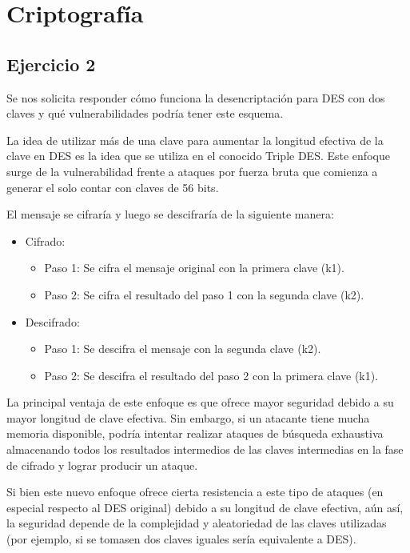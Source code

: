 \documentclass[11pt]{article}
\begin{document}
\section{Criptografía}

\subsection*{Ejercicio 2}
Se nos solicita responder cómo funciona la desencriptación para DES con dos claves y 
qué vulnerabilidades podría tener este esquema.

La idea de utilizar más de una clave para aumentar la longitud efectiva de la clave en DES es la idea 
que se utiliza en el conocido Triple DES. Este enfoque surge de la vulnerabilidad frente a ataques por fuerza bruta 
que comienza a generar el solo contar con claves de 56 bits.

El mensaje se cifraría y luego se descifraría de la siguiente manera:

\begin{itemize}
\item Cifrado:

\begin{itemize}
\item Paso 1: Se cifra el mensaje original con la primera clave (k1).
\item Paso 2: Se cifra el resultado del paso 1 con la segunda clave (k2).
\end{itemize}

\item Descifrado:

\begin{itemize}
\item Paso 1: Se descifra el mensaje con la segunda clave (k2).
\item Paso 2: Se descifra el resultado del paso 2 con la primera clave (k1).
\end{itemize}

\end{itemize}

La principal ventaja de este enfoque es que ofrece mayor seguridad debido a su mayor longitud de clave efectiva. 
Sin embargo, si un atacante tiene mucha memoria disponible, podría intentar realizar ataques de búsqueda exhaustiva 
almacenando todos los resultados intermedios de las claves intermedias en la fase de cifrado y lograr producir un ataque.

Si bien este nuevo enfoque ofrece cierta resistencia a este tipo de ataques (en especial respecto al DES original)
debido a su longitud de clave efectiva, 
aún así, la seguridad depende de la complejidad y aleatoriedad de las claves utilizadas (por ejemplo, si
se tomasen dos claves iguales sería equivalente a DES).
\end{document}

